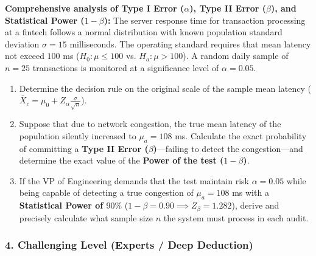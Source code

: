 \begin{problema}
	\label{prob:doc_errores_potencia_muestra}
	\textbf{Comprehensive analysis of Type I Error ($\alpha$), Type II Error ($\beta$), and Statistical Power ($1-\beta$):}
	The server response time for transaction processing at a fintech follows a normal distribution with known population standard deviation $\sigma = 15$ milliseconds. The operating standard requires that mean latency not exceed $100$ ms ($H_0: \mu \le 100$ vs. $H_a: \mu > 100$). A random daily sample of $n = 25$ transactions is monitored at a significance level of $\alpha = 0.05$.
	\begin{enumerate}
		\item Determine the decision rule on the original scale of the sample mean latency ($\bar{X}_c = \mu_0 + Z_\alpha \frac{\sigma}{\sqrt{n}}$).
		\item Suppose that due to network congestion, the true mean latency of the population silently increased to $\mu_a = 108$ ms. Calculate the exact probability of committing a \textbf{Type II Error ($\beta$)}—failing to detect the congestion—and determine the exact value of the \textbf{Power of the test ($1-\beta$)}.
		\item If the VP of Engineering demands that the test maintain risk $\alpha = 0.05$ while being capable of detecting a true congestion of $\mu_a = 108$ ms with a \textbf{Statistical Power of $90\%$} ($1-\beta = 0.90 \implies Z_\beta = 1.282$), derive and precisely calculate what sample size $n$ the system must process in each audit.
	\end{enumerate}
\end{problema}

\subsubsection*{4. Challenging Level (Experts / Deep Deduction)}

